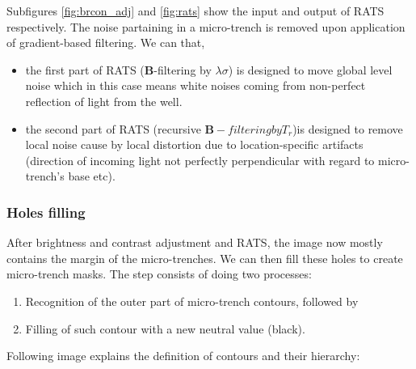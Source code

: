 \documentclass[pdftex,12pt,a4paper]{report}
\begin{document}
Subfigures \ref{fig:brcon_adj} and \ref{fig:rats} show the input and output of  RATS respectively. The noise partaining in a micro-trench is removed upon application of gradient-based filtering. We can that,

\begin{itemize}
\item the first part of RATS ($\mathbf{B}$-filtering by $\lambda \sigma$) is designed to move global level noise  which in this case means white noises coming from non-perfect reflection of light from the well.
\item the second part of RATS (recursive $\mathbf{B}-filtering by T_r$)is designed to remove local noise cause by local distortion due to location-specific artifacts (direction of incoming light not perfectly perpendicular with regard to micro-trench's base etc).
\end{itemize}

\subsubsection*{Holes filling}

After brightness and contrast adjustment and RATS, the image now mostly contains the margin of the micro-trenches. We can then fill these holes to create micro-trench masks. The step consists of doing two processes:

\begin{enumerate}
\item Recognition of the outer part of micro-trench contours, followed by
\item Filling of such contour with a new neutral value (black).
\end{enumerate}

Following image explains the definition of contours and their hierarchy:
\end{document}
